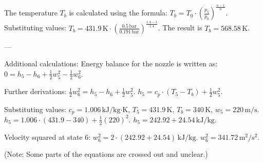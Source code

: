 The temperature \( T_b \) is calculated using the formula:  
\( T_b = T_0 \cdot \left( \frac{p_5}{p_0} \right)^{\frac{n-1}{n}} \).  
Substituting values:  
\( T_b = 431.9 \, \text{K} \cdot \left( \frac{0.5 \, \text{bar}}{0.191 \, \text{bar}} \right)^{\frac{1.4-1}{1.4}} \).  
The result is \( T_b = 568.58 \, \text{K} \).

---

Additional calculations:  
Energy balance for the nozzle is written as:  
\( 0 = h_5 - h_6 + \frac{1}{2} w_5^2 - \frac{1}{2} w_6^2 \).  

Further derivations:  
\( \frac{1}{2} w_6^2 = h_5 - h_6 + \frac{1}{2} w_5^2 \).  
\( h_5 = c_p \cdot (T_5 - T_b) + \frac{1}{2} w_5^2 \).  

Substituting values:  
\( c_p = 1.006 \, \text{kJ/kg·K} \), \( T_5 = 431.9 \, \text{K} \), \( T_b = 340 \, \text{K} \), \( w_5 = 220 \, \text{m/s} \).  
\( h_5 = 1.006 \cdot (431.9 - 340) + \frac{1}{2} (220)^2 \).  
\( h_5 = 242.92 + 24.54 \, \text{kJ/kg} \).  

Velocity squared at state 6:  
\( w_6^2 = 2 \cdot (242.92 + 24.54) \, \text{kJ/kg} \).  
\( w_6^2 = 341.72 \, \text{m}^2/\text{s}^2 \).  

(Note: Some parts of the equations are crossed out and unclear.)